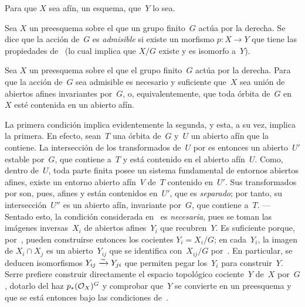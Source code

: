 
\begin{corollaire}
\label{V.1.6}
Para que $X$ sea afín, \resp un esquema,
que~$Y$ lo sea.
\end{corollaire}

\begin{definition}
\label{V.1.7}
Sea
$X$ un preesquema sobre el que un grupo finito~$G$ actúa por la derecha. Se
dice que la acción de~$G$ es \emph{admisible} si existe un morfismo
$p\colon X\to Y$ que tiene las propiedades de~ (lo cual implica
que $X/G$ existe y es isomorfo a~$Y$).
\end{definition}

\begin{proposition}
\label{V.1.8}
Sea $X$ un preesquema sobre el que el grupo finito~$G$ actúa por la derecha.
Para que la acción de~$G$ sea admisible es necesario y suficiente que~$X$
sea unión de abiertos afines invariantes por~$G$, o, equivalentemente, que
toda órbita de~$G$ en~$X$ esté contenida en un abierto afín.
\end{proposition}

La primera condición implica evidentemente la segunda, y esta, a su vez,
implica la primera. En efecto, sean~$T$ una órbita de~$G$ y~$U$ un abierto
afín que la contiene. La intersección de los transformados de~$U$ por
es entonces un abierto~$U'$ estable por~$G$, que contiene a~$T$ y está
contenido en el abierto afín~$U$. Como, dentro de~$U$, toda parte finita
posee un sistema fundamental de entornos abiertos afines, existe un entorno
abierto afín~$V$ de~$T$ contenido en~$U'$. Sus transformados por
son, pues, afines y están contenidos en~$U'$, que es \emph{separado}; por
tanto, su intersección~$U''$ es un abierto afín, invariante por~$G$, que
contiene a~$T$.
--- Sentado esto, la condición considerada en~ es
\emph{necesaria}, pues se toman las imágenes inversas~$X_i$ de abiertos
afines~$Y_i$ que recubren~$Y$. Es suficiente porque, por~, pueden
construirse entonces los cocientes $Y_i=X_i/G$; en cada~$Y_i$, la imagen de
$X_i\cap X_j$ es un abierto~$Y_{ij}$ que se identifica con~$X_{ij}/G$
por~. En particular, se deducen isomorfismos
$Y_{ij}\isomto Y_{ji}$ que permiten pegar los~$Y_i$ para construir~$Y$.
Serre prefiere construir directamente el espacio topológico cociente~$Y$
de~$X$ por~$G$, dotarlo del haz $p_*(\cal{O}_X)^G$ y comprobar que~$Y$ se
convierte en un preesquema y que se está entonces bajo las condiciones
de~.

